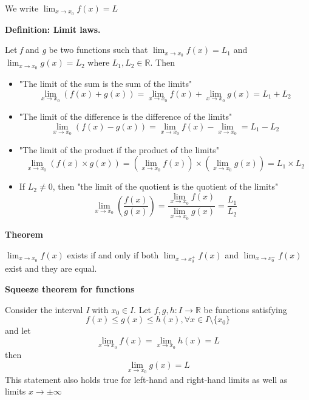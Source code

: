 \documentclass{article}
\newcommand*{\R}{\mathbb{R}}
\begin{document}
We write \(\lim_{x\to x_0}f(x)=L\)

\vspace{\baselineskip}
\textbf{Definition: Limit laws.}

Let \textit{f} and \textit{g} be two functions such that \(\lim_{x\to x_0}f(x)=L_1\) and \(\lim_{x \to x_0}g(x) = L_2\) where \(L_1,L_2 \in \R\). Then
\begin{itemize}
    \item "The limit of the sum is the sum of the limits"
    \begin{equation}
        \lim_{x\to x_0}(f(x) + g(x)) = \lim_{x\to x_0}f(x) + \lim_{x \to x_0}g(x) = L_1 + L_2
    \end{equation}
    
    \item "The limit of the difference is the difference of the limits"
    \begin{equation}
        \lim_{x \to x_0}(f(x) - g(x)) = \lim_{x\to x_0}f(x) - \lim_{x\to x_0} = L_1 - L_2
    \end{equation}
    \item "The limit of the product if the product of the limits"
    \begin{equation}
        \lim_{x \to x_0}\left(f(x) \times g(x)\right) = \left(\lim_{x\to x_0}f(x)\right)\times\left(\lim_{x\to x_0}g(x)\right) = L_1 \times L_2
    \end{equation}
    \item If \(L_2 \neq 0\), then "the limit of the quotient is the quotient of the limits"
    \begin{equation}
        \lim_{x\to x_0}\left(\frac{f(x)}{g(x)}\right) = \frac{\lim_{x\to x_0}f(x)}{\lim_{x\to x_0}g(x)} = \frac{L_1}{L_2}
    \end{equation}
\end{itemize}

\vspace{\baselineskip}
\textbf{Theorem}

\(\lim_{x\to x_0}f(x)\) exists if and only if both \(\lim_{x\to x_0^{+}}f(x)\) and \(\lim_{x\to x_0^{-}}f(x)\) exist and they are equal.

\vspace{\baselineskip}
\textbf{Squeeze theorem for functions}

Consider the interval \textit{I} with \(x_0 \in I\). Let \(f,g,h:I\to\R\) be functions satisfying 
\begin{equation}
    f(x) \leq g(x) \leq h(x), \forall x \in I \setminus \{x_0\}
\end{equation}
and let
\begin{equation}
    \lim_{x\to x_0}f(x) = \lim_{x\to x_0}h(x) = L
\end{equation}
then
\begin{equation}
    \lim_{x\to x_0}g(x) = L
\end{equation}
This statement also holds true for left-hand and right-hand limits as well as limits \(x \to \pm\infty\)
\end{document}
